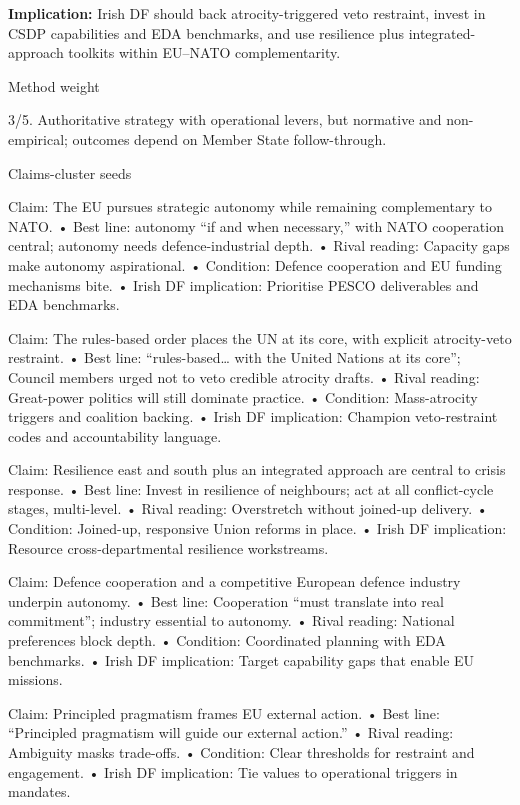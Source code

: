 \textbf{Implication:} Irish DF should back atrocity-triggered veto restraint, invest in CSDP capabilities and EDA benchmarks, and use resilience plus integrated-approach toolkits within EU–NATO complementarity.

Method weight

3/5. Authoritative strategy with operational levers, but normative and non-empirical; outcomes depend on Member State follow-through.

Claims-cluster seeds

Claim: The EU pursues strategic autonomy while remaining complementary to NATO.
• Best line: autonomy “if and when necessary,” with NATO cooperation central; autonomy needs defence-industrial depth.
• Rival reading: Capacity gaps make autonomy aspirational.
• Condition: Defence cooperation and EU funding mechanisms bite.
• Irish DF implication: Prioritise PESCO deliverables and EDA benchmarks.

Claim: The rules-based order places the UN at its core, with explicit atrocity-veto restraint.
• Best line: “rules-based… with the United Nations at its core”; Council members urged not to veto credible atrocity drafts.
• Rival reading: Great-power politics will still dominate practice.
• Condition: Mass-atrocity triggers and coalition backing.
• Irish DF implication: Champion veto-restraint codes and accountability language.

Claim: Resilience east and south plus an integrated approach are central to crisis response.
• Best line: Invest in resilience of neighbours; act at all conflict-cycle stages, multi-level.
• Rival reading: Overstretch without joined-up delivery.
• Condition: Joined-up, responsive Union reforms in place.
• Irish DF implication: Resource cross-departmental resilience workstreams.

Claim: Defence cooperation and a competitive European defence industry underpin autonomy.
• Best line: Cooperation “must translate into real commitment”; industry essential to autonomy.
• Rival reading: National preferences block depth.
• Condition: Coordinated planning with EDA benchmarks.
• Irish DF implication: Target capability gaps that enable EU missions.

Claim: Principled pragmatism frames EU external action.
• Best line: “Principled pragmatism will guide our external action.”
• Rival reading: Ambiguity masks trade-offs.
• Condition: Clear thresholds for restraint and engagement.
• Irish DF implication: Tie values to operational triggers in mandates.

